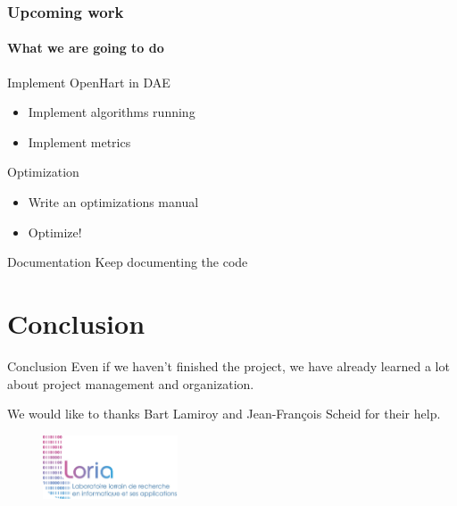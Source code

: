 \documentclass[c]{beamer}
\begin{document}
\begin{frame}
\frametitle{Upcoming work}
\framesubtitle{What we are going to do}
\begin{block}{Implement OpenHart in DAE}
\begin{itemize}
	\item Implement algorithms running
	\item Implement metrics
\end{itemize}
\end{block}

\begin{block}{Optimization}
	\begin{itemize}
	\item Write an optimizations manual
	\item Optimize!
	\end{itemize}
\end{block}

\begin{block}{Documentation}
Keep documenting the code
\end{block}
\end{frame}

\section{Conclusion}
\begin{frame}
  \begin{block}{Conclusion}
   Even if we haven’t finished the project, we have already learned a lot about project management and organization.

   We would like to thanks Bart Lamiroy and Jean-François Scheid for their help.
  \end{block}
  \begin{figure}
    \includegraphics[width=4cm]{loria}
  \end{figure}
\end{frame}
\end{document}
